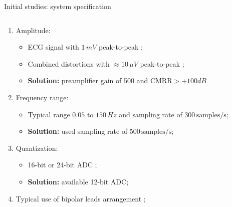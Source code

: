 \begin{frame}{Initial studies: system specification}
\begin{minipage}[c][0.5\textheight][c]{\linewidth}
  \begin{columns}[onlytextwidth]
    \begin{column}{\textwidth} 
        \begin{enumerate}
            \item Amplitude:
            \begin{itemize}
                \item ECG signal with $1 \, mV$ peak-to-peak \cite{khandpur2019compendium};
                \item Combined distortions with $\approx 10 \, \mu V$ peak-to-peak \cite{khandpur1987handbook};
                \item \textbf{Solution:} preamplifier gain of 500 \cite{khandpur2019compendium} and $\text{CMRR}>+100dB$ \cite{khandpur2019compendium, khandpur2005biomedical}
            \end{itemize}
            \item Frequency range:
            \begin{itemize}
                \item Typical range $0.05$ to $150 \, Hz$ and sampling rate of $300 \, \text{samples/s}$;
                \item \textbf{Solution:} used sampling rate of $500 \, \text{samples/s}$;
            \end{itemize}
            \item Quantization:
            \begin{itemize}
                \item 16-bit or 24-bit ADC \cite{khandpur2019compendium};
                \item \textbf{Solution:} available 12-bit ADC;
            \end{itemize}
            \item Typical use of bipolar leads arrangement \cite{khandpur2019compendium};
        \end{enumerate}
      \end{column}

  \end{columns}
    \end{minipage}
\end{frame}


